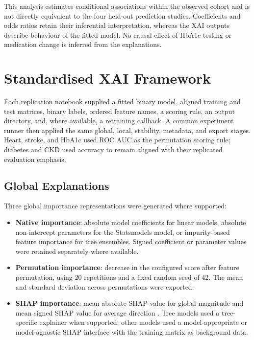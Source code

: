 This analysis estimates conditional associations within the observed cohort and is not directly equivalent to the four held-out prediction studies. Coefficients and odds ratios retain their inferential interpretation, whereas the XAI outputs describe behaviour of the fitted model. No causal effect of HbA1c testing or medication change is inferred from the explanations.

\section{Standardised XAI Framework}

Each replication notebook supplied a fitted binary model, aligned training and test matrices, binary labels, ordered feature names, a scoring rule, an output directory, and, where available, a retraining callback. A common experiment runner then applied the same global, local, stability, metadata, and export stages. Heart, stroke, and HbA1c used ROC AUC as the permutation scoring rule; diabetes and CKD used accuracy to remain aligned with their replicated evaluation emphasis.

\subsection{Global Explanations}

Three global importance representations were generated where supported:

\begin{itemize}
    \item \textbf{Native importance}: absolute model coefficients for linear models, absolute non-intercept parameters for the Statsmodels model, or impurity-based feature importance for tree ensembles. Signed coefficient or parameter values were retained separately where available.
    \item \textbf{Permutation importance}: decrease in the configured score after feature permutation, using 20 repetitions and a fixed random seed of 42. The mean and standard deviation across permutations were exported.
    \item \textbf{SHAP importance}: mean absolute SHAP value for global magnitude and mean signed SHAP value for average direction \citep{NIPS2017_8a20a862}. Tree models used a tree-specific explainer when supported; other models used a model-appropriate or model-agnostic SHAP interface with the training matrix as background data.
\end{itemize}

